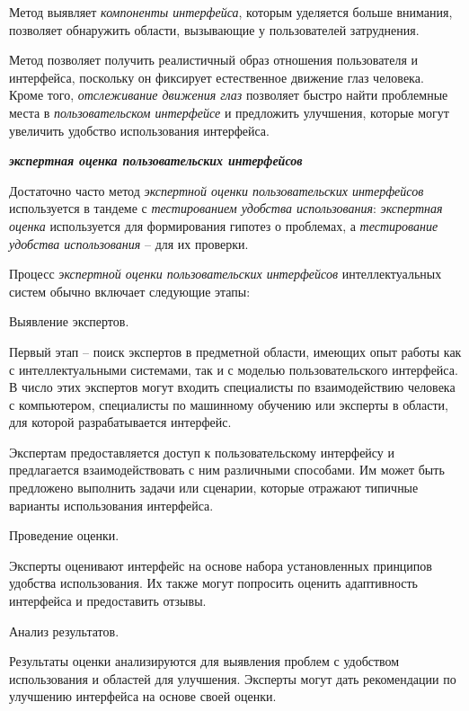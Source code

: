 {Метод выявляет \textit{компоненты интерфейса}, которым уделяется больше внимания, позволяет обнаружить области, вызывающие у пользователей затруднения.

Метод позволяет получить реалистичный образ отношения пользователя и интерфейса, поскольку он фиксирует естественное движение глаз человека. Кроме того, \textit{отслеживание движения глаз} позволяет быстро найти проблемные места в \textit{пользовательском интерфейсе} и предложить улучшения, которые могут увеличить удобство использования интерфейса.


\textbf{\textit{экспертная оценка пользовательских интерфейсов}} 

Достаточно часто метод \textit{экспертной оценки пользовательских интерфейсов} используется в тандеме с \textit{тестированием удобства использования}: \textit{экспертная оценка} используется для формирования гипотез о проблемах, а \textit{тестирование удобства использования} -- для их проверки.

Процесс \textit{экспертной оценки пользовательских интерфейсов} интеллектуальных систем обычно включает следующие этапы:

\begin{textitemize}
\item Выявление экспертов. 

Первый этап -- поиск экспертов в предметной области, имеющих опыт работы как с интеллектуальными системами, так и с моделью пользовательского интерфейса. В число этих экспертов могут входить специалисты по взаимодействию человека с компьютером, специалисты по машинному обучению или эксперты в области, для которой разрабатывается интерфейс.

Экспертам предоставляется доступ к пользовательскому интерфейсу и предлагается взаимодействовать с ним различными способами. Им может быть предложено выполнить задачи или сценарии, которые отражают типичные варианты использования интерфейса.

\item Проведение оценки. 

Эксперты оценивают интерфейс на основе набора установленных принципов удобства использования. Их также могут попросить оценить адаптивность интерфейса и предоставить отзывы.

\item Анализ результатов. 

Результаты оценки анализируются для выявления проблем с удобством использования и областей для улучшения. Эксперты могут дать рекомендации по улучшению интерфейса на основе своей оценки.
\end{textitemize}


}
